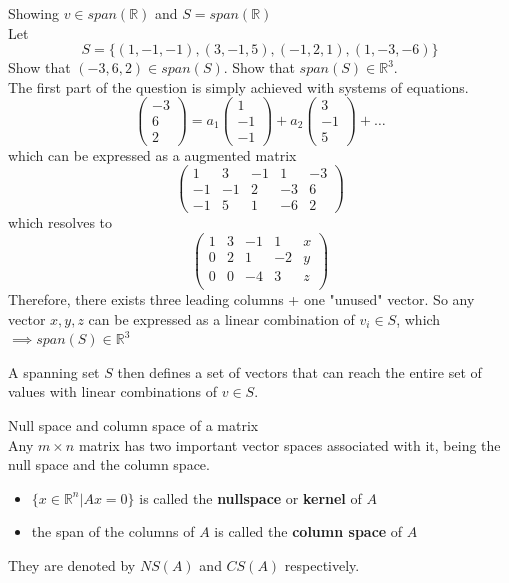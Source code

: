 \documentclass[journal, letterpaper]{IEEEtran}
\begin{document}
    \begin{myboxg}{Showing $v \in span(\mathbb{R})$ and $S = span(\mathbb{R})$} \\ 
        Let 
        $$ S = \{(1, -1, -1), (3, -1, 5), (-1, 2, 1), (1, -3, -6) \} $$
        Show that $(-3, 6, 2) \in span(S)$. Show that $span(S) \in \mathbb{R}^3$.
        \newline \\ 
        The first part of the question is simply achieved with systems of equations.
        $$ \begin{pmatrix}
            -3 \\ 6 \\ 2
        \end{pmatrix} = a_1 \begin{pmatrix}
            1 \\ -1 \\ -1
        \end{pmatrix} + a_2 \begin{pmatrix}
            3 \\ -1 \\ 5
        \end{pmatrix} + \dots$$
        which can be expressed as a augmented matrix
        $$
        \begin{pmatrix}
            1 & 3 & -1 & 1 & -3 \\ -1 & -1 & 2 & -3 & 6 \\ -1 & 5 & 1 & -6 & 2
        \end{pmatrix}
        $$
        which resolves to 
        $$
        \begin{pmatrix}
            1 & 3 & -1 & 1 & x \\ 
            0 & 2 & 1 & -2 & y \\ 
            0 & 0 & -4 & 3 & z \\ 
        \end{pmatrix}
        $$
        Therefore, there exists three leading columns + one "unused" vector. So any vector $x, y, z$ can be expressed 
        as a linear combination of $v_i \in S$, which $\implies span(S) \in \mathbb{R}^3$
    \end{myboxg}
    A spanning set $S$ then defines a set of vectors that can reach the entire set of values with linear combinations of $v \in S$.
    \begin{myboxr}{Null space and column space of a matrix} \\ 
        Any $m \times n$ matrix has two important vector spaces associated with it, being the null space and the column space.
        \begin{itemize}
            \item $\{x \in \mathbb{R}^n | Ax = 0 \}$ is called the \textbf{nullspace} or \textbf{kernel} of $A$
            \item the span of the columns of $A$ is called the \textbf{column space} of $A$
        \end{itemize}
        They are denoted by $NS(A)$ and $CS(A)$ respectively.
    \end{myboxr}
\end{document}
